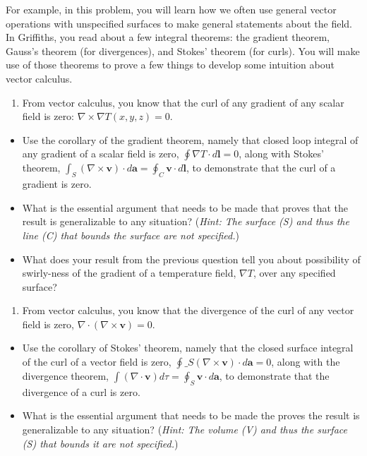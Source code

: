 \documentclass[
  letterpaperpaper,
]{article}
\providecommand{\tightlist}{%
  \setlength{\itemsep}{0pt}\setlength{\parskip}{0pt}}
\begin{document}
For example, in this problem, you will learn how we often use general
vector operations with unspecified surfaces to make general statements
about the field. In Griffiths, you read about a few integral theorems:
the gradient theorem, Gauss's theorem (for divergences), and Stokes'
theorem (for curls). You will make use of those theorems to prove a few
things to develop some intuition about vector calculus.

\begin{enumerate}
\def\labelenumi{\arabic{enumi}.}
\tightlist
\item
  From vector calculus, you know that the curl of any gradient of any
  scalar field is zero: $\nabla \times \nabla T(x,y,z) = 0 $.
\end{enumerate}

\begin{itemize}
\tightlist
\item
  Use the corollary of the gradient theorem, namely that closed loop
  integral of any gradient of a scalar field is zero,
  \(\oint \nabla T\cdot d\mathbf{l} = 0\), along with Stokes' theorem,
  \(\int_S(\nabla \times \mathbf{v})\cdot d\mathbf{a} = \oint_C \mathbf{v}\cdot d\mathbf{l}\),
  to demonstrate that the curl of a gradient is zero.
\item
  What is the essential argument that needs to be made that proves that
  the result is generalizable to any situation? (\emph{Hint: The surface
  (S) and thus the line (C) that bounds the surface are not specified.})
\item
  What does your result from the previous question tell you about
  possibility of swirly-ness of the gradient of a temperature field,
  \(\nabla T\), over any specified surface?
\end{itemize}

\begin{enumerate}
\def\labelenumi{\arabic{enumi}.}
\setcounter{enumi}{1}
\tightlist
\item
  From vector calculus, you know that the divergence of the curl of any
  vector field is zero, \(\nabla \cdot (\nabla \times \mathbf{v}) = 0\).
\end{enumerate}

\begin{itemize}
\tightlist
\item
  Use the corollary of Stokes' theorem, namely that the closed surface
  integral of the curl of a vector field is zero, $\oint\_S
  (\nabla \times \mathbf{v})\cdot d\mathbf{a} = 0 $, along with the
  divergence theorem,
  \(\int(\nabla \cdot \mathbf{v}) d\tau = \oint_S \mathbf{v}\cdot d\mathbf{a}\),
  to demonstrate that the divergence of a curl is zero.
\item
  What is the essential argument that needs to be made the proves the
  result is generalizable to any situation? (\emph{Hint: The volume (V)
  and thus the surface (S) that bounds it are not specified.})
\end{itemize}
\end{document}
